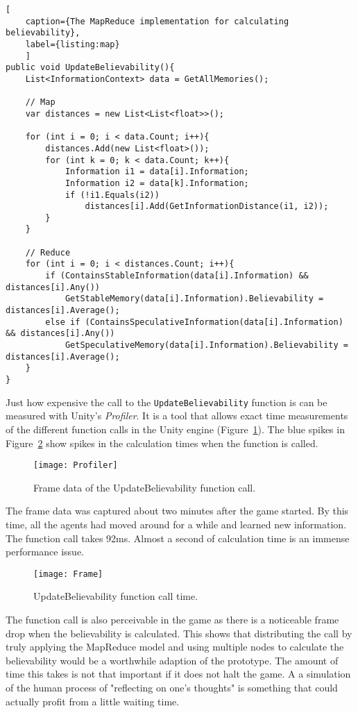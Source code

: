 \begin{lstlisting}[
	caption={The MapReduce implementation for calculating believability},
	label={listing:map}
	]
public void UpdateBelievability(){
	List<InformationContext> data = GetAllMemories();
	
	// Map
	var distances = new List<List<float>>();
	
	for (int i = 0; i < data.Count; i++){
		distances.Add(new List<float>());
		for (int k = 0; k < data.Count; k++){
			Information i1 = data[i].Information;
			Information i2 = data[k].Information;
			if (!i1.Equals(i2))
				distances[i].Add(GetInformationDistance(i1, i2));
		}
	}
	
	// Reduce
	for (int i = 0; i < distances.Count; i++){
		if (ContainsStableInformation(data[i].Information) && distances[i].Any())
			GetStableMemory(data[i].Information).Believability = distances[i].Average();
		else if (ContainsSpeculativeInformation(data[i].Information) && distances[i].Any())
			GetSpeculativeMemory(data[i].Information).Believability = distances[i].Average();
	}
}
\end{lstlisting}
Just how expensive the call to the \verb|UpdateBelievability| function is can be measured with Unity's \textit{Profiler}. It is a tool that allows exact time measurements of the different function calls in the Unity engine (Figure~\ref{fig:profiler}). The blue spikes in Figure~\ref{fig:frame} show spikes in the calculation times when the function is called.
\begin{figure}
	\centering
	\texttt{[image: Profiler]}
	\caption{Frame data of the UpdateBelievability function call.}
	\label{fig:profiler}
\end{figure}
The frame data was captured about two minutes after the game started. By this time, all the agents had moved around for a while and learned new information. The function call takes 92ms. Almost a second of calculation time is an immense performance issue.
\begin{figure}
	\centering
	\texttt{[image: Frame]}
	\caption{UpdateBelievability function call time.}
	\label{fig:frame}
\end{figure}
The function call is also perceivable in the game as there is a noticeable frame drop when the believability is calculated. This shows that distributing the call by truly applying the MapReduce model and using multiple nodes to calculate the believability would be a worthwhile adaption of the prototype. The amount of time this takes is not that important if it does not halt the game. A a simulation of the human process of "reflecting on one's thoughts" is something that could actually profit from a little waiting time.

